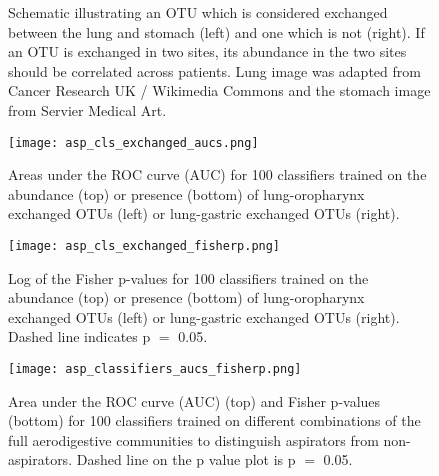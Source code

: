 \begin{figure}[h]
        \begin{center}
        \caption{Schematic illustrating an OTU which is considered exchanged between the lung and stomach (left) and one which is not (right). If an OTU is exchanged in two sites, its abundance in the two sites should be correlated across patients. Lung image was adapted from Cancer Research UK / Wikimedia Commons and the stomach image from Servier Medical Art.}
        \label{fig:exchanged_schematic}
        \end{center}
\end{figure}


\begin{figure}[h]
        \begin{center}\texttt{[image: asp\_cls\_exchanged\_aucs.png]}
        \caption{Areas under the ROC curve (AUC) for 100 classifiers trained on the abundance (top) or presence (bottom) of lung-oropharynx exchanged OTUs (left) or lung-gastric exchanged OTUs (right).}
        \label{fig:exchanged_cls_aucs}
        \end{center}
\end{figure}

\begin{figure}[h]
        \begin{center}\texttt{[image: asp\_cls\_exchanged\_fisherp.png]}
        \caption{Log of the Fisher p-values for 100 classifiers trained on the abundance (top) or presence (bottom) of lung-oropharynx exchanged OTUs (left) or lung-gastric exchanged OTUs (right). Dashed line indicates p $=$ 0.05.}
        \label{fig:exchanged_cls_p}
        \end{center}
\end{figure}

\begin{figure}[h]
        \begin{center}\texttt{[image: asp\_classifiers\_aucs\_fisherp.png]}
        \caption{Area under the ROC curve (AUC) (top) and Fisher p-values (bottom) for 100 classifiers trained on different combinations of the full aerodigestive communities to distinguish aspirators from non-aspirators. Dashed line on the p value plot is p $=$ 0.05.}
        \label{fig:aucs_pvalues}
        \end{center}
\end{figure}
